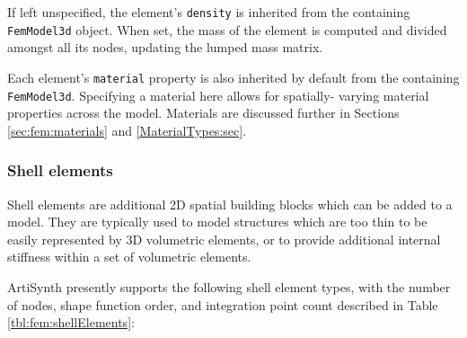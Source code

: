 If left unspecified, the element's {\tt density} is inherited from the 
containing {\tt FemModel3d} object.  When set, the mass of the element is
computed and divided amongst all its nodes, updating the lumped mass
matrix.

Each element's {\tt material} property is also inherited by default from the 
containing {\tt FemModel3d}. Specifying a material here allows for spatially-%
varying material properties across the model.  Materials are discussed
further in Sections \ref{sec:fem:materials} and \ref{MaterialTypes:sec}.

\subsubsection{Shell elements}

Shell elements are additional 2D spatial building blocks which can be
added to a model. They are typically used to model structures which
are too thin to be easily represented by 3D volumetric elements, or to
provide additional internal stiffness within a set of volumetric
elements.

ArtiSynth presently supports the following shell element types, with
the number of nodes, shape function order, and integration point count
described in Table \ref{tbl:fem:shellElements}:

